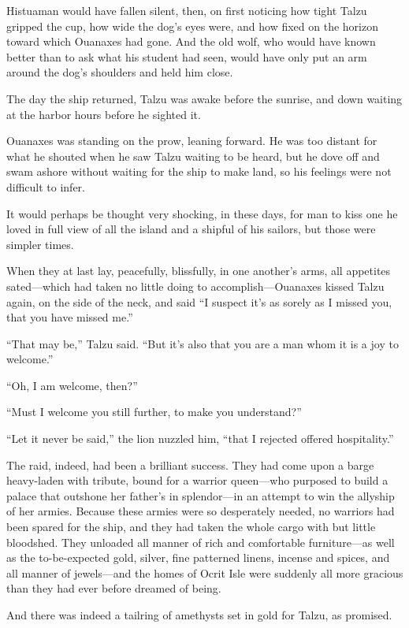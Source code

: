 Histuaman would have fallen silent, then, on first noticing how tight Talzu gripped the cup, how wide the dog's eyes were, and how fixed on the horizon toward which Ouanaxes had gone. And the old wolf, who would have known better than to ask what his student had seen, would have only put an arm around the dog's shoulders and held him close.

The day the ship returned, Talzu was awake before the sunrise, and down waiting at the harbor hours before he sighted it.

Ouanaxes was standing on the prow, leaning forward. He was too distant for what he shouted when he saw Talzu waiting to be heard, but he dove off and swam ashore without waiting for the ship to make land, so his feelings were not difficult to infer.

It would perhaps be thought very shocking, in these days, for man to kiss one he loved in full view of all the island and a shipful of his sailors, but those were simpler times.

When they at last lay, peacefully, blissfully, in one another's arms, all appetites sated---which had taken no little doing to accomplish---Ouanaxes kissed Talzu again, on the side of the neck, and said ``I suspect it's as sorely as I missed you, that you have missed me.''

``That may be,'' Talzu said. ``But it's also that you are a man whom it is a joy to welcome.''

``Oh, I am welcome, then?''

``Must I welcome you still further, to make you understand?''

``Let it never be said,'' the lion nuzzled him, ``that I rejected offered hospitality.''

The raid, indeed, had been a brilliant success. They had come upon a barge heavy-laden with tribute, bound for a warrior queen---who purposed to build a palace that outshone her father's in splendor---in an attempt to win the allyship of her armies. Because these armies were so desperately needed, no warriors had been spared for the ship, and they had taken the whole cargo with but little bloodshed. They unloaded all manner of rich and comfortable furniture---as well as the to-be-expected gold, silver, fine patterned linens, incense and spices, and all manner of jewels---and the homes of Ocrit Isle were suddenly all more gracious than they had ever before dreamed of being.

And there was indeed a tailring of amethysts set in gold for Talzu, as promised.

